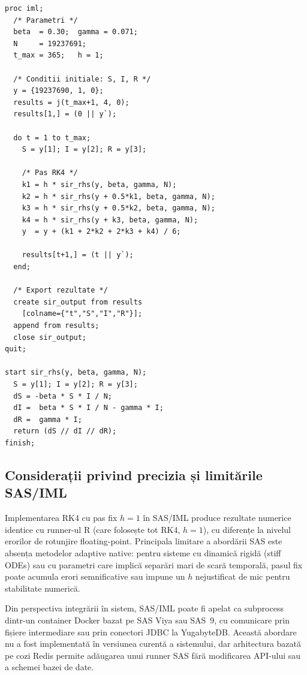 \begin{lstlisting}[language=SAS, caption={Implementare RK4 manual în SAS/IML pentru modelul SIR.}]
proc iml;
  /* Parametri */
  beta  = 0.30;  gamma = 0.071;
  N     = 19237691;
  t_max = 365;   h = 1;

  /* Conditii initiale: S, I, R */
  y = {19237690, 1, 0};
  results = j(t_max+1, 4, 0);
  results[1,] = (0 || y`);

  do t = 1 to t_max;
    S = y[1]; I = y[2]; R = y[3];

    /* Pas RK4 */
    k1 = h * sir_rhs(y, beta, gamma, N);
    k2 = h * sir_rhs(y + 0.5*k1, beta, gamma, N);
    k3 = h * sir_rhs(y + 0.5*k2, beta, gamma, N);
    k4 = h * sir_rhs(y + k3, beta, gamma, N);
    y  = y + (k1 + 2*k2 + 2*k3 + k4) / 6;

    results[t+1,] = (t || y`);
  end;

  /* Export rezultate */
  create sir_output from results
    [colname={"t","S","I","R"}];
  append from results;
  close sir_output;
quit;

start sir_rhs(y, beta, gamma, N);
  S = y[1]; I = y[2]; R = y[3];
  dS = -beta * S * I / N;
  dI =  beta * S * I / N - gamma * I;
  dR =  gamma * I;
  return (dS // dI // dR);
finish;
\end{lstlisting}

\subsection{Considerații privind precizia și limitările SAS/IML}
\label{subsec:sas_particularitati}

Implementarea RK4 cu pas fix $h=1$ în SAS/IML produce rezultate numerice
identice cu runner-ul R (care folosește tot RK4, $h=1$), cu diferențe la
nivelul erorilor de rotunjire floating-point. Principala limitare a abordării
SAS este absența metodelor adaptive native: pentru sisteme cu dinamică
rigidă (stiff ODEs) sau cu parametri care implică separări mari de scară
temporală, pasul fix poate acumula erori semnificative sau impune un $h$
nejustificat de mic pentru stabilitate numerică.

Din perspectiva integrării în sistem, SAS/IML poate fi apelat ca subprocess
dintr-un container Docker bazat pe SAS Viya sau SAS~9, cu comunicare prin
fișiere intermediare sau prin conectori JDBC la YugabyteDB. Această abordare
nu a fost implementată în versiunea curentă a sistemului, dar arhitectura
bazată pe cozi Redis permite adăugarea unui runner SAS fără modificarea
API-ului sau a schemei bazei de date.

